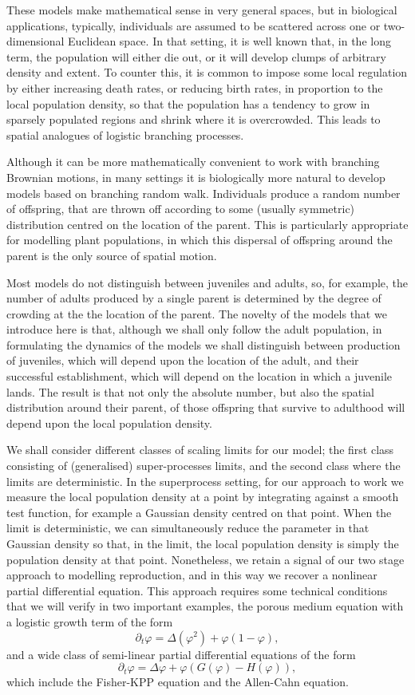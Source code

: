 \documentclass[12pt]{article}
\begin{document}
These models make mathematical sense in very general spaces, but
in biological applications, typically, 
individuals are assumed to be scattered across one or two-dimensional
Euclidean space. In that setting, it is well known that, 
in the long term, the population will either 
die out, or it will develop clumps of arbitrary density and extent. 
To counter this, it is common to
impose some local regulation by either increasing death rates, or 
reducing birth rates, in proportion to the local population density,
so that the population has a tendency to grow in sparsely populated regions
and shrink where it is overcrowded. This leads to spatial analogues of  
logistic branching processes.

Although it can be more mathematically convenient to work with branching
Brownian motions, in many settings it is biologically more natural to 
develop models based on branching random walk.  
Individuals produce a random number of offspring,
that are thrown off according to some (usually symmetric) 
distribution centred on the location of the parent.   
This is particularly appropriate for modelling plant populations, in which
this dispersal of offspring around the parent is the only source of
spatial motion.


Most models do not distinguish between juveniles and adults, so,
for example, the number of adults produced by a single parent is determined
by the degree of crowding at the the location of the parent. The novelty
of the models that we introduce here is that, although we shall only
follow the adult population, in formulating the dynamics of the
models we shall distinguish
between production of juveniles, which will depend upon the location of 
the adult, and their successful establishment, which will depend on the
location in which a juvenile lands. The result is that not only the absolute 
number, but also the spatial distribution
around their parent, 
of those offspring that survive to adulthood
will depend upon the local population 
density. 


We shall consider different classes of scaling limits for our model; the first class consisting of
(generalised) super-processes limits, and the second class where the limits are deterministic. In the
superprocess setting, for our approach to work we measure the local population
density at a point by integrating against a smooth test function, for example 
a Gaussian density centred on that point.  
When the limit is deterministic,
we can simultaneously reduce the parameter in that Gaussian density so that,
in the limit, the local population density is simply the population density 
at that point. Nonetheless, we retain a signal of our two stage approach
to modelling reproduction, and  
in this way we recover a nonlinear partial differential equation. 
This approach requires some technical conditions that we will verify in two important examples,
the porous medium equation with a logistic growth term of the form 
$$\partial_t \varphi = \Delta (\varphi^2)+\varphi(1-\varphi),$$
and a wide class of semi-linear partial differential equations of the form 
$$\partial_t \varphi = \Delta\varphi+ \varphi \left(G(\varphi)-H(\varphi)\right),$$
which include the Fisher-KPP equation and the Allen-Cahn equation.
\end{document}
